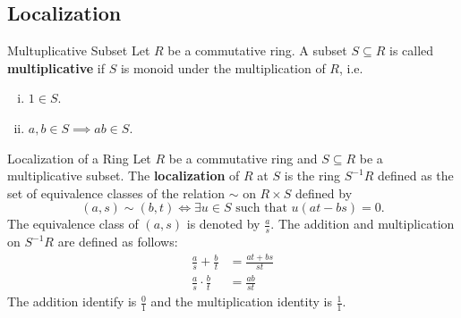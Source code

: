 \subsection{Localization}
\begin{definition}{Multuplicative Subset}{}
    Let $R$ be a commutative ring. A subset $S\subseteq R$ is called \textbf{multiplicative} if $S$ is monoid under the multiplication of $R$, i.e.
    \begin{enumerate}[(i)]
        \item $1\in S$.
        \item $a,b\in S\implies ab\in S$.
    \end{enumerate}
\end{definition}



\begin{definition}{Localization of a Ring}{}
    Let $R$ be a commutative ring and $S\subseteq R$ be a multiplicative subset. The \textbf{localization} of $R$ at $S$ is the ring $S^{-1}R$ defined as the set of equivalence classes of the relation $\sim$ on $R\times S$ defined by $$(a,s)\sim (b,t)\iff \exists u\in S\text{ such that }u(at-bs)=0.$$
    The equivalence class of $(a,s)$ is denoted by $\frac{a}{s}$. The addition and multiplication on $S^{-1}R$ are defined as follows:
    \begin{align*}
        \frac{a}{s}+\frac{b}{t}&=\frac{at+bs}{st}\\
        \frac{a}{s}\cdot\frac{b}{t}&=\frac{ab}{st}
    \end{align*}
    The addition identify is $\frac{0}{1}$ and the multiplication identity is $\frac{1}{1}$.
\end{definition}


